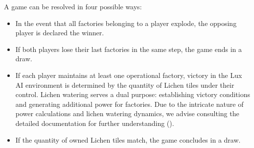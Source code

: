 \noindent A game can be resolved in four possible ways:

\begin{itemize}[itemsep=1pt, parsep=0pt]
\item 
In the event that all factories belonging to a player explode, the opposing player is declared the winner.
\item 
If both players lose their last factories in the same step, the game ends in a draw.
\item If each player maintains at least one operational factory, victory in the Lux AI environment is determined by the quantity of Lichen tiles under their control. Lichen watering serves a dual purpose: establishing victory conditions and generating additional power for factories. Due to the intricate nature of power calculations and lichen watering dynamics, we advise consulting the detailed documentation for further understanding (\textcolor{deepblue}{\cite{lux-ai-season-2}}).
\item If the quantity of owned Lichen tiles match, the game concludes in a draw.
\end{itemize}
\noindent






